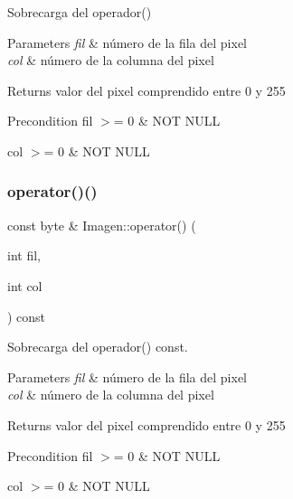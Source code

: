 Sobrecarga del operador() 


\begin{DoxyParams}{Parameters}
{\em fil} & número de la fila del pixel \\
\hline
{\em col} & número de la columna del pixel \\
\hline
\end{DoxyParams}
\begin{DoxyReturn}{Returns}
valor del pixel comprendido entre 0 y 255 
\end{DoxyReturn}
\begin{DoxyPrecond}{Precondition}
fil $>$= 0 \& N\+OT N\+U\+LL 

col $>$= 0 \& N\+OT N\+U\+LL 
\end{DoxyPrecond}
\mbox{\label{class_imagen_a21594449ed38ecd66afe2c5cb95caf63}} 
\subsubsection{\texorpdfstring{operator()()}{operator()()}\hspace{0.1cm}{\footnotesize\ttfamily [2/2]}}
{\footnotesize\ttfamily const byte \& Imagen\+::operator() (\begin{DoxyParamCaption}\item[{int}]{fil,  }\item[{int}]{col }\end{DoxyParamCaption}) const}



Sobrecarga del operador() const. 


\begin{DoxyParams}{Parameters}
{\em fil} & número de la fila del pixel \\
\hline
{\em col} & número de la columna del pixel \\
\hline
\end{DoxyParams}
\begin{DoxyReturn}{Returns}
valor del pixel comprendido entre 0 y 255 
\end{DoxyReturn}
\begin{DoxyPrecond}{Precondition}
fil $>$= 0 \& N\+OT N\+U\+LL 

col $>$= 0 \& N\+OT N\+U\+LL 
\end{DoxyPrecond}
\mbox{\label{class_imagen_aeecce0f8947fbefd2468e8b43ac33f4a}} 

